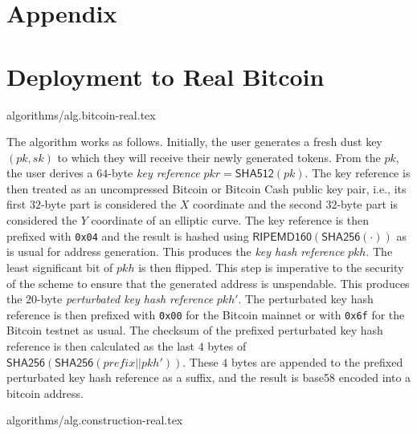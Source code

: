 \section*{Appendix}
\section{Deployment to Real Bitcoin}
{algorithms/alg.bitcoin-real.tex}

The algorithm works as follows. Initially, the user generates a fresh dust key
$(pk, sk)$ to which they will receive their newly generated tokens.  From the $pk$, the user derives a $64$-byte
\emph{key reference} $pkr = \textsf{SHA512}(pk)$. The key reference is then
treated as an uncompressed Bitcoin or Bitcoin Cash public key pair, i.e., its
first $32$-byte part is considered the $X$ coordinate and the second $32$-byte
part is considered the $Y$ coordinate of an elliptic curve. The key reference is
then prefixed with \texttt{0x04} and the result is hashed using
$\textsf{RIPEMD160}(\textsf{SHA256}(\cdot))$ as is usual for address generation.
This produces the \emph{key hash reference} $pkh$. The least significant bit of
$pkh$ is then flipped. This step is imperative to the security of the scheme to
ensure that the generated address is unspendable. This produces the $20$-byte
\emph{perturbated key hash reference} $pkh'$. The perturbated key hash reference
is then prefixed with \texttt{0x00} for the Bitcoin mainnet or with
\texttt{0x6f} for the Bitcoin testnet as usual. The checksum of the prefixed
perturbated key hash reference is then calculated as the last $4$ bytes of
$\textsf{SHA256}(\textsf{SHA256}(prefix || pkh'))$. These $4$ bytes are appended
to the prefixed perturbated key hash reference as a suffix, and the result is
\textsf{base58} encoded into a bitcoin address.

{algorithms/alg.construction-real.tex}
